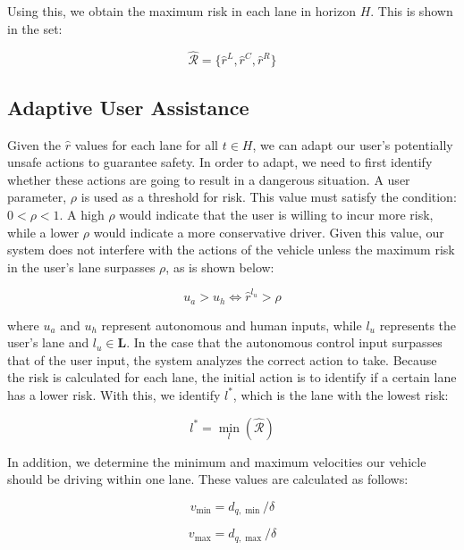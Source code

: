 \documentclass[conference]{IEEEtran}
\begin{document}
Using this, we obtain the maximum risk in each lane in horizon $H$. This is shown in the set:

\begin{equation}
    \hat{\mathcal{R}} = \{\hat{r}^{L},\hat{r}^{C},\hat{r}^{R}\}
\end{equation}

\subsection{Adaptive User Assistance}

Given the $\hat{r}$ values for each lane for all $t\in H$, we can adapt our user's potentially unsafe actions to guarantee safety. In order to adapt, we need to first identify whether these actions are going to result in a dangerous situation. A user parameter, $\rho$ is used as a threshold for risk. This value must satisfy the condition: $0<\rho<1$. A high $\rho$ would indicate that the user is willing to incur more risk, while a lower $\rho$ would indicate a more conservative driver. Given this value, our system does not interfere with the actions of the vehicle unless the maximum risk in the user's lane surpasses $\rho$, as is shown below:

\begin{equation}
    u_a > u_h \iff \hat r^{l_u} > \rho
\end{equation}

where $u_a$ and $u_h$ represent autonomous and human inputs, while $l_u$ represents the user's lane and $l_u \in \mathbf{L}$. In the case that the autonomous control input surpasses that of the user input, the system analyzes the correct action to take. Because the risk is calculated for each lane, the initial action is to identify if a certain lane has a lower risk. With this, we identify $l^*$, which is the lane with the lowest risk:

\begin{equation}
    l^* = \min_l(\mathcal{\hat{R}})
\end{equation}

In addition, we determine the minimum and maximum velocities our vehicle should be driving within one lane. These values are calculated as follows:

\begin{equation}
    v_{\min} = d_{q,\min}/\delta
\end{equation}

\begin{equation}
    v_{\max} = d_{q,\max}/\delta
\end{equation}
\end{document}
